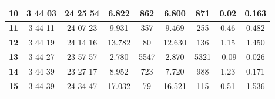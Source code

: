 \documentclass[12pt]{article}
\begin{document}
\begin{table}[H]
{\begin{tabular}{|c|c|c|c|c|c|c|c|c|}
        \textbf{10}   & 3  44  03                                                        & 24  25  54                                                         & 6.822      & 862                                                        & 6.800      & 871                                                        & 0.02         & 0.163                                                            \\ \hline
        \textbf{11}   & 3  44  11                                                        & 24  07  23                                                         & 9.931      & 357                                                        & 9.469      & 255                                                        & 0.46         & 0.482                                                            \\ \hline
        \textbf{12}   & 3  44  19                                                        & 24  14  16                                                         & 13.782     & 80                                                         & 12.630     & 136                                                        & 1.15         & 1.450                                                            \\ \hline
        \textbf{13}   & 3  44  27                                                        & 23  57  57                                                         & 2.780      & 5547                                                       & 2.870      & 5321                                                       & -0.09        & 0.026                                                            \\ \hline
        \textbf{14}   & 3  44  39                                                        & 23  27  17                                                         & 8.952      & 723                                                        & 7.720      & 988                                                        & 1.23         & 0.171                                                            \\ \hline
        \textbf{15}   & 3  44  39                                                        & 24  34  47                                                         & 17.032     & 79                                                         & 16.521     & 115                                                        & 0.51         & 1.536                                                            \\ \hline

\end{tabular}}
\end{table}
\end{document}
